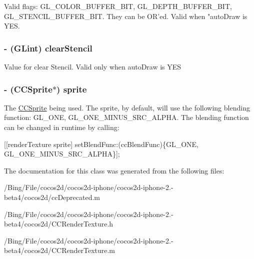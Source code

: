 Valid flags\-: G\-L\-\_\-\-C\-O\-L\-O\-R\-\_\-\-B\-U\-F\-F\-E\-R\-\_\-\-B\-I\-T, G\-L\-\_\-\-D\-E\-P\-T\-H\-\_\-\-B\-U\-F\-F\-E\-R\-\_\-\-B\-I\-T, G\-L\-\_\-\-S\-T\-E\-N\-C\-I\-L\-\_\-\-B\-U\-F\-F\-E\-R\-\_\-\-B\-I\-T. They can be O\-R'ed. Valid when "auto\-Draw is Y\-E\-S. \hypertarget{class_c_c_render_texture_a715880e5dc695f243e3ce08b3f8dd09d}{
\subsubsection[{clear\-Stencil}]{\setlength{\rightskip}{0pt plus 5cm}-\/ (G\-Lint) {\bf clear\-Stencil}}}\label{class_c_c_render_texture_a715880e5dc695f243e3ce08b3f8dd09d}
Value for clear Stencil. Valid only when auto\-Draw is Y\-E\-S \hypertarget{class_c_c_render_texture_a1e77dcd25e60ceb47d423854eab9c2b7}{
\subsubsection[{sprite}]{\setlength{\rightskip}{0pt plus 5cm}-\/ ({\bf C\-C\-Sprite}$\ast$) {\bf sprite}}}\label{class_c_c_render_texture_a1e77dcd25e60ceb47d423854eab9c2b7}
The \hyperlink{class_c_c_sprite}{C\-C\-Sprite} being used. The sprite, by default, will use the following blending function\-: G\-L\-\_\-\-O\-N\-E, G\-L\-\_\-\-O\-N\-E\-\_\-\-M\-I\-N\-U\-S\-\_\-\-S\-R\-C\-\_\-\-A\-L\-P\-H\-A. The blending function can be changed in runtime by calling\-:
\begin{DoxyItemize}
\item \mbox{[}\mbox{[}render\-Texture sprite\mbox{]} set\-Blend\-Func\-:(cc\-Blend\-Func)\{G\-L\-\_\-\-O\-N\-E, G\-L\-\_\-\-O\-N\-E\-\_\-\-M\-I\-N\-U\-S\-\_\-\-S\-R\-C\-\_\-\-A\-L\-P\-H\-A\}\mbox{]}; 
\end{DoxyItemize}

The documentation for this class was generated from the following files\-:\begin{DoxyCompactItemize}
\item 
/\-Bing/\-File/cocos2d/cocos2d-\/iphone/cocos2d-\/iphone-\/2.-\/beta4/cocos2d/cc\-Deprecated.\-m\item 
/\-Bing/\-File/cocos2d/cocos2d-\/iphone/cocos2d-\/iphone-\/2.-\/beta4/cocos2d/C\-C\-Render\-Texture.\-h\item 
/\-Bing/\-File/cocos2d/cocos2d-\/iphone/cocos2d-\/iphone-\/2.-\/beta4/cocos2d/C\-C\-Render\-Texture.\-m\end{DoxyCompactItemize}
